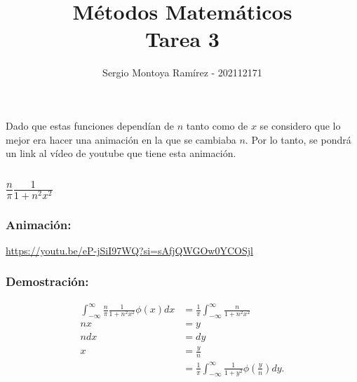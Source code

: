 \documentclass{report}   
\title{\Huge{Métodos Matemáticos}\\Tarea 3}
\author{\huge{Sergio Montoya Ramírez - 202112171}}
\date{}
\begin{document}
\maketitle
\newpage%
\tableofcontents
\pagebreak

\chapter{}

Dado que estas funciones dependían de $n$ tanto como de $x$ se considero que lo mejor era hacer una animación en la que se cambiaba $n$. Por lo tanto, se pondrá un link al vídeo de youtube que tiene esta animación.

\section{$\frac{n}{\pi}\frac{1}{1 + n^2x^2}$}

\subsection{Animación:}
\url{https://youtu.be/eP-jSiI97WQ?si=sAfjQWGOw0YCOSjl}

\subsection{Demostración:}

\begin{align*}
  \int_{-\infty}^{\infty}\frac{n}{\pi}\frac{1}{1 + n^2x^2}\phi\left( x \right) dx &= \frac{1}{\pi}\int_{-\infty}^{\infty} \frac{n}{1 + n^2x^2} \\
  nx &= y \\
  n dx &= dy \\
  x &= \frac{y}{n} \\
  &= \frac{1}{\pi}\int_{-\infty}^{\infty} \frac{1}{1 + y^2} \phi\left( \frac{y}{n} \right) dy
.\end{align*}
\end{document}
